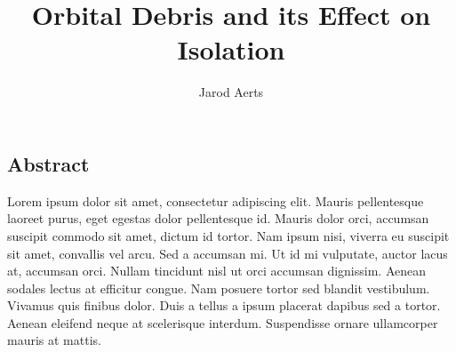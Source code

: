 \documentclass[12pt]{article}
\author{Jarod Aerts\vspace{-2ex}%
}
\title{Orbital Debris and its Effect on Isolation\vspace{-2ex}%
}
\begin{document}
\maketitle

\begin{center}
	\section*{Abstract} \label{abstract}
	Lorem ipsum dolor sit amet, consectetur adipiscing elit. Mauris pellentesque laoreet purus, eget egestas dolor pellentesque id. Mauris dolor orci, accumsan suscipit commodo sit amet, dictum id tortor. Nam ipsum nisi, viverra eu suscipit sit amet, convallis vel arcu. Sed a accumsan mi. Ut id mi vulputate, auctor lacus at, accumsan orci. Nullam tincidunt nisl ut orci accumsan dignissim. Aenean sodales lectus at efficitur congue. Nam posuere tortor sed blandit vestibulum. Vivamus quis finibus dolor. Duis a tellus a ipsum placerat dapibus sed a tortor. Aenean eleifend neque at scelerisque interdum. Suspendisse ornare ullamcorper mauris at mattis.

\end{center}
\end{document}
